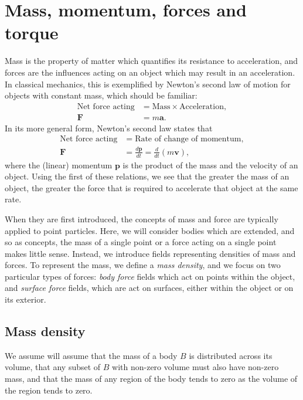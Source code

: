 \documentclass[
  letterpaper,
  DIV=11,
  numbers=noendperiod]{scrreprt}
\theoremstyle{plain}
\theoremstyle{remark}
\begin{document}
\section{Mass, momentum, forces and
torque}\label{mass-momentum-forces-and-torque}

Mass is the property of matter which quantifies its resistance to
acceleration, and forces are the influences acting on an object which
may result in an acceleration. In classical mechanics, this is
exemplified by Newton's second law of motion for objects with constant
mass, which should be familiar: \[
\begin{aligned}
\text{Net force acting} &= \text{Mass} \times \text{Acceleration},\\[1mm]
{\boldsymbol{F}}&=m{\boldsymbol{a}}.
\end{aligned}
\] In its more general form, Newton's second law states that \[
\begin{aligned}
\text{Net force acting} &= \text{Rate of change of momentum},\\
{\boldsymbol{F}}&=\frac{d{\boldsymbol{p}}}{dt}=\frac{d}{dt}(m{\boldsymbol{v}}),
\end{aligned}
\] where the (linear) momentum \({\boldsymbol{p}}\) is the product of
the mass and the velocity of an object. Using the first of these
relations, we see that the greater the mass of an object, the greater
the force that is required to accelerate that object at the same rate.

When they are first introduced, the concepts of mass and force are
typically applied to point particles. Here, we will consider bodies
which are extended, and so as concepts, the mass of a single point or a
force acting on a single point makes little sense. Instead, we introduce
fields representing densities of mass and forces. To represent the mass,
we define a \emph{mass density}, and we focus on two particular types of
forces: \emph{body force} fields which act on points within the object,
and \emph{surface force} fields, which are act on surfaces, either
within the object or on its exterior.

\subsection{Mass density}\label{mass-density}

We assume will assume that the mass of a body \(B\) is distributed
across its volume, that any subset of \(B\) with non-zero volume must
also have non-zero mass, and that the mass of any region of the body
tends to zero as the volume of the region tends to zero.
\end{document}

